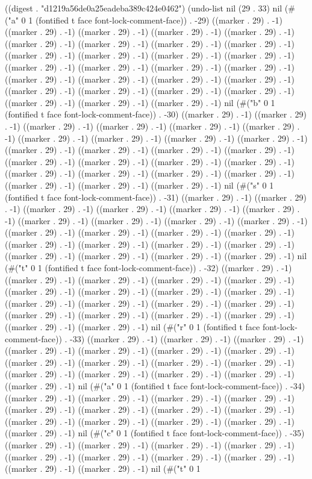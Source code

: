 
((digest . "d1219a56de0a25eadeba389c424e0462") (undo-list nil (29 . 33) nil (#("a" 0 1 (fontified t face font-lock-comment-face)) . -29) ((marker . 29) . -1) ((marker . 29) . -1) ((marker . 29) . -1) ((marker . 29) . -1) ((marker . 29) . -1) ((marker . 29) . -1) ((marker . 29) . -1) ((marker . 29) . -1) ((marker . 29) . -1) ((marker . 29) . -1) ((marker . 29) . -1) ((marker . 29) . -1) ((marker . 29) . -1) ((marker . 29) . -1) ((marker . 29) . -1) ((marker . 29) . -1) ((marker . 29) . -1) ((marker . 29) . -1) ((marker . 29) . -1) ((marker . 29) . -1) ((marker . 29) . -1) ((marker . 29) . -1) ((marker . 29) . -1) ((marker . 29) . -1) ((marker . 29) . -1) ((marker . 29) . -1) ((marker . 29) . -1) ((marker . 29) . -1) nil (#("b" 0 1 (fontified t face font-lock-comment-face)) . -30) ((marker . 29) . -1) ((marker . 29) . -1) ((marker . 29) . -1) ((marker . 29) . -1) ((marker . 29) . -1) ((marker . 29) . -1) ((marker . 29) . -1) ((marker . 29) . -1) ((marker . 29) . -1) ((marker . 29) . -1) ((marker . 29) . -1) ((marker . 29) . -1) ((marker . 29) . -1) ((marker . 29) . -1) ((marker . 29) . -1) ((marker . 29) . -1) ((marker . 29) . -1) ((marker . 29) . -1) ((marker . 29) . -1) ((marker . 29) . -1) ((marker . 29) . -1) ((marker . 29) . -1) ((marker . 29) . -1) ((marker . 29) . -1) ((marker . 29) . -1) nil (#("s" 0 1 (fontified t face font-lock-comment-face)) . -31) ((marker . 29) . -1) ((marker . 29) . -1) ((marker . 29) . -1) ((marker . 29) . -1) ((marker . 29) . -1) ((marker . 29) . -1) ((marker . 29) . -1) ((marker . 29) . -1) ((marker . 29) . -1) ((marker . 29) . -1) ((marker . 29) . -1) ((marker . 29) . -1) ((marker . 29) . -1) ((marker . 29) . -1) ((marker . 29) . -1) ((marker . 29) . -1) ((marker . 29) . -1) ((marker . 29) . -1) ((marker . 29) . -1) ((marker . 29) . -1) ((marker . 29) . -1) ((marker . 29) . -1) nil (#("t" 0 1 (fontified t face font-lock-comment-face)) . -32) ((marker . 29) . -1) ((marker . 29) . -1) ((marker . 29) . -1) ((marker . 29) . -1) ((marker . 29) . -1) ((marker . 29) . -1) ((marker . 29) . -1) ((marker . 29) . -1) ((marker . 29) . -1) ((marker . 29) . -1) ((marker . 29) . -1) ((marker . 29) . -1) ((marker . 29) . -1) ((marker . 29) . -1) ((marker . 29) . -1) ((marker . 29) . -1) ((marker . 29) . -1) ((marker . 29) . -1) ((marker . 29) . -1) nil (#("r" 0 1 (fontified t face font-lock-comment-face)) . -33) ((marker . 29) . -1) ((marker . 29) . -1) ((marker . 29) . -1) ((marker . 29) . -1) ((marker . 29) . -1) ((marker . 29) . -1) ((marker . 29) . -1) ((marker . 29) . -1) ((marker . 29) . -1) ((marker . 29) . -1) ((marker . 29) . -1) ((marker . 29) . -1) ((marker . 29) . -1) ((marker . 29) . -1) ((marker . 29) . -1) ((marker . 29) . -1) nil (#("a" 0 1 (fontified t face font-lock-comment-face)) . -34) ((marker . 29) . -1) ((marker . 29) . -1) ((marker . 29) . -1) ((marker . 29) . -1) ((marker . 29) . -1) ((marker . 29) . -1) ((marker . 29) . -1) ((marker . 29) . -1) ((marker . 29) . -1) ((marker . 29) . -1) ((marker . 29) . -1) ((marker . 29) . -1) ((marker . 29) . -1) nil (#("c" 0 1 (fontified t face font-lock-comment-face)) . -35) ((marker . 29) . -1) ((marker . 29) . -1) ((marker . 29) . -1) ((marker . 29) . -1) ((marker . 29) . -1) ((marker . 29) . -1) ((marker . 29) . -1) ((marker . 29) . -1) ((marker . 29) . -1) ((marker . 29) . -1) nil (#("t" 0 1 